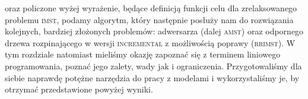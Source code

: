 oraz policzone wyżej wyrażenie, będące definicją funkcji celu dla zrelaksowanego problemu \textsc{imst}, podamy algorytm, który następnie posłuży nam do rozwiązania kolejnych, bardziej złożonych problemów: adwersarza (dalej \textsc{amst}) oraz odpornego drzewa rozpinającego w wersji \textsc{incremental} z możliwością poprawy (\textsc{rrimst}). W tym rozdziale natomiast mieliśmy okazję zapoznać się z terminem liniowego programowania, poznać jego zalety, wady jak i ograniczenia. Przygotowaliśmy dla siebie naprawdę potężne narzędzia do pracy z modelami i wykorzystaliśmy je, by otrzymać przedstawione powyżej wyniki.